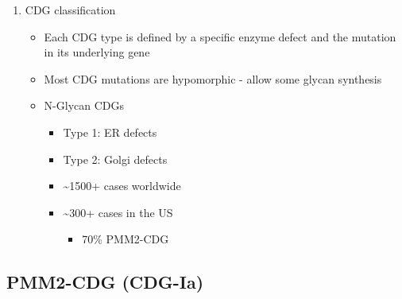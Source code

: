 \documentclass{scrartcl}
\begin{document}
\begin{enumerate}
\item CDG classification
\label{sec:org7f4d056}
\begin{itemize}
\item Each CDG type is defined by a specific enzyme defect and the mutation in its underlying gene
\item Most CDG mutations are hypomorphic - allow some glycan synthesis
\item N-Glycan CDGs
\begin{itemize}
\item Type 1: ER defects
\item Type 2: Golgi defects
\item \textasciitilde{}1500+ cases worldwide
\item \textasciitilde{}300+ cases in the US
\begin{itemize}
\item 70\% PMM2-CDG
\end{itemize}
\end{itemize}
\end{itemize}
\end{enumerate}


\subsection{PMM2-CDG (CDG-Ia)}
\label{sec:org1e48fe3}
\end{document}
